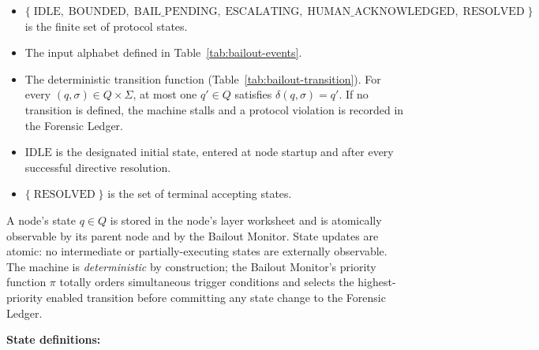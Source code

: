 \begin{itemize}\itemsep=0pt
\item[$Q$] $\{\;\text{IDLE},\; \text{BOUNDED},\; \text{BAIL\_PENDING},\;
  \text{ESCALATING},\; \text{HUMAN\_ACKNOWLEDGED},\; \text{RESOLVED}\; \}$ is the
  finite set of protocol states.
\item[$\Sigma$] The input alphabet defined in Table~\ref{tab:bailout-events}.
\item[$\delta : Q \times \Sigma \to Q$] The deterministic transition function
  (Table~\ref{tab:bailout-transition}). For every $(q, \sigma) \in Q \times
  \Sigma$, at most one $q' \in Q$ satisfies $\delta(q, \sigma) = q'$.
  If no transition is defined, the machine stalls and a protocol violation is
  recorded in the Forensic Ledger.
\item[$q_0$] $\text{IDLE}$ is the designated initial state, entered at node
  startup and after every successful directive resolution.
\item[$F$] $\{\;\text{RESOLVED}\; \}$ is the set of terminal accepting states.
\end{itemize}

A node's state $q \in Q$ is stored in the node's \fact{} layer worksheet and is
atomically observable by its parent node and by the Bailout Monitor. State updates
are atomic: no intermediate or partially-executing states are externally
observable. The machine is \emph{deterministic} by construction; the Bailout
Monitor's priority function $\pi$ totally orders simultaneous trigger conditions
and selects the highest-priority enabled transition before committing any state
change to the Forensic Ledger.

\bigskip

\noindent\textbf{State definitions:}

